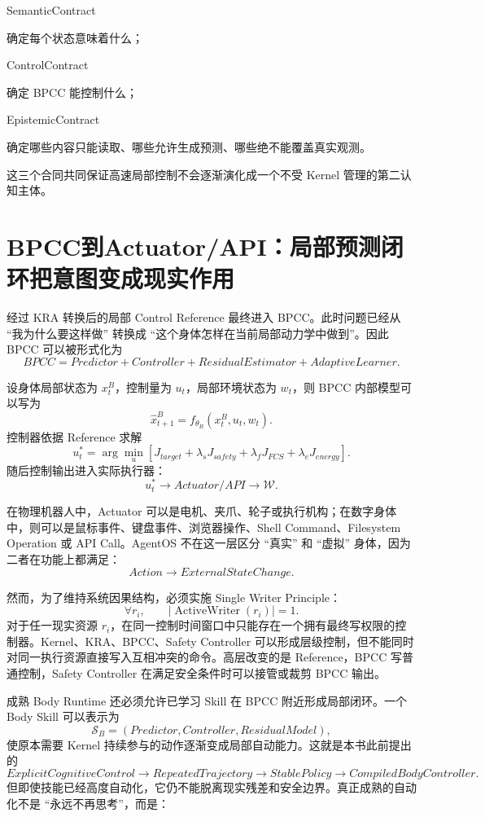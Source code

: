 \begin{statementbox}
SemanticContract
\end{statementbox}
确定每个状态意味着什么；

\begin{statementbox}
ControlContract
\end{statementbox}
确定 BPCC 能控制什么；

\begin{statementbox}
EpistemicContract
\end{statementbox}
确定哪些内容只能读取、哪些允许生成预测、哪些绝不能覆盖真实观测。

这三个合同共同保证高速局部控制不会逐渐演化成一个不受 Kernel 管理的第二认知主体。


\section{BPCC到Actuator/API：局部预测闭环把意图变成现实作用}

经过 KRA 转换后的局部 Control Reference 最终进入 BPCC。此时问题已经从 ``我为什么要这样做'' 转换成 ``这个身体怎样在当前局部动力学中做到''。因此 BPCC 可以被形式化为
\[
\boxed{
BPCC
=
Predictor
+
Controller
+
ResidualEstimator
+
AdaptiveLearner .
}
\]

设身体局部状态为 $x^B_t$，控制量为 $u_t$，局部环境状态为 $w_t$，则 BPCC 内部模型可以写为
\[
\hat x^B_{t+1}
=
f_{\theta_B}
\left(
x^B_t,
u_t,
w_t
\right).
\]
控制器依据 Reference 求解
\[
u_t^*
=
\arg\min_{u}
\left[
J_{target}
+
\lambda_sJ_{safety}
+
\lambda_fJ_{FCS}
+
\lambda_eJ_{energy}
\right].
\]
随后控制输出进入实际执行器：
\[
u_t^*
\rightarrow
Actuator/API
\rightarrow
\mathcal W .
\]

在物理机器人中，Actuator 可以是电机、夹爪、轮子或执行机构；在数字身体中，则可以是鼠标事件、键盘事件、浏览器操作、Shell Command、Filesystem Operation 或 API Call。AgentOS 不在这一层区分 ``真实'' 和 ``虚拟'' 身体，因为二者在功能上都满足：
\[
Action
\rightarrow
ExternalStateChange .
\]

然而，为了维持系统因果结构，必须实施 Single Writer Principle：
\[
\boxed{
\forall r_i,\qquad
|\operatorname{ActiveWriter}(r_i)|=1 .
}
\]
对于任一现实资源 $r_i$，在同一控制时间窗口中只能存在一个拥有最终写权限的控制器。Kernel、KRA、BPCC、Safety Controller 可以形成层级控制，但不能同时对同一执行资源直接写入互相冲突的命令。高层改变的是 Reference，BPCC 写普通控制，Safety Controller 在满足安全条件时可以接管或裁剪 BPCC 输出。

成熟 Body Runtime 还必须允许已学习 Skill 在 BPCC 附近形成局部闭环。一个 Body Skill 可以表示为
\[
\mathcal S_B
=
(Predictor,Controller,ResidualModel),
\]
使原本需要 Kernel 持续参与的动作逐渐变成局部自动能力。这就是本书此前提出的
\[
ExplicitCognitiveControl
\rightarrow
RepeatedTrajectory
\rightarrow
StablePolicy
\rightarrow
CompiledBodyController .
\]
但即使技能已经高度自动化，它仍不能脱离现实残差和安全边界。真正成熟的自动化不是 ``永远不再思考''，而是：
\begin{statementbox}
\centering
{}
\end{statementbox}

